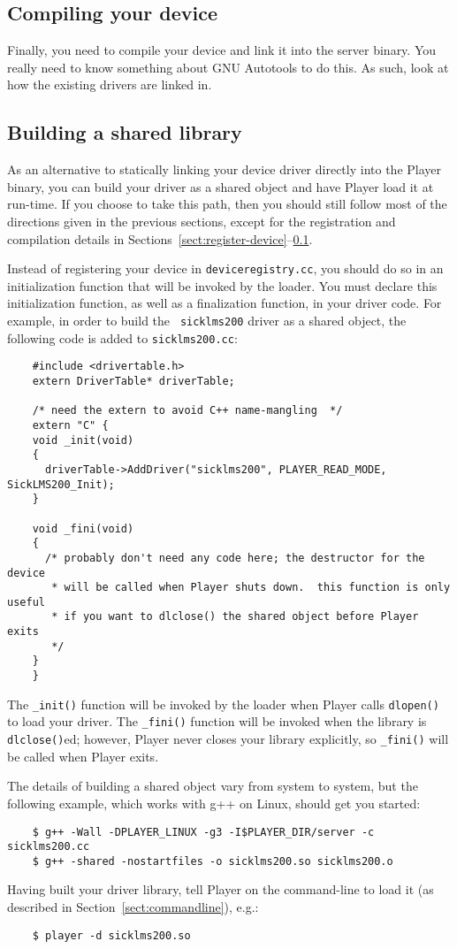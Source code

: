 \documentclass[11pt]{report}
\begin{document}
\subsection{Compiling your device}
\label{sect:compilation}
Finally, you need to compile your device and link it into the server binary.
You really need to know something about GNU Autotools to do this.  As such,
look at how the existing drivers are linked in.


\subsection{Building a shared library}
\label{sect:shared-lib}
As an alternative to statically linking your device driver directly into the
Player binary, you can build your driver as a shared object and have Player
load it at run-time.  If you choose to take this path, then you should still
follow most of the directions given in the previous sections, except for the
registration and compilation details in 
Sections~\ref{sect:register-device}--\ref{sect:compilation}.

Instead of registering your device in {\tt deviceregistry.cc}, you should
do so in an initialization function that will be invoked by the loader.
You must declare this initialization function, as well as a finalization
function, in your driver code.  For example, in order to build the {\tt
sicklms200} driver as a shared object, the following code is added 
to {\tt sicklms200.cc}:
\begin{verbatim}
    #include <drivertable.h>
    extern DriverTable* driverTable;
    
    /* need the extern to avoid C++ name-mangling  */
    extern "C" {
    void _init(void)
    {
      driverTable->AddDriver("sicklms200", PLAYER_READ_MODE, SickLMS200_Init);
    }
    
    void _fini(void)
    {
      /* probably don't need any code here; the destructor for the device
       * will be called when Player shuts down.  this function is only useful
       * if you want to dlclose() the shared object before Player exits
       */
    }
    }
\end{verbatim}
The {\tt \_init()} function will be invoked by the loader when Player
calls {\tt dlopen()} to load your driver.  The {\tt \_fini()} function
will be invoked when the library is {\tt dlclose()}ed; however, Player never
closes your library explicitly, so {\tt \_fini()} will be called when Player
exits.

The details of building a shared object vary from system to system, but the
following example, which works with g++ on Linux, should get you started:
\begin{verbatim}
    $ g++ -Wall -DPLAYER_LINUX -g3 -I$PLAYER_DIR/server -c sicklms200.cc
    $ g++ -shared -nostartfiles -o sicklms200.so sicklms200.o
\end{verbatim}
Having built your driver library, tell Player on the command-line to load it
(as described in Section~\ref{sect:commandline}), e.g.:
\begin{verbatim}
    $ player -d sicklms200.so
\end{verbatim}
\end{document}
